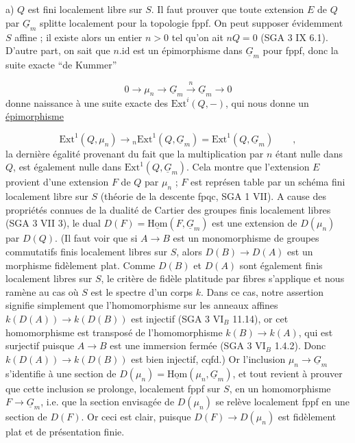 a) $Q$ est fini localement libre sur $S$. Il faut prouver que toute extension $E$ de $Q$ par $\underline{G}_m$ splitte localement pour la topologie fppf. On peut supposer évidemment $S$ affine ; il existe alors un entier $n > 0$ tel qu'on ait $nQ = 0$ (SGA 3 IX 6.1). D'autre part, on sait que $n.\mathrm{id}$ est un épimorphisme dans $\underline{G}_m$ pour fppf, donc la suite exacte ``de Kummer''

\begin{equation*}
0 \longrightarrow \mu_n \longrightarrow \underline{G}_m \xrightarrow{\ n\ } \underline{G}_m \longrightarrow 0
\end{equation*}
donne naissance à une suite exacte des $\mathrm{Ext}^i(Q, - )$, qui nous donne un \underline{épimorphisme}

\begin{equation*}
\mathrm{Ext}^1(Q,\mu_n) \longrightarrow {}_n\mathrm{Ext}^1(Q,\underline{G}_m) = \mathrm{Ext}^1(Q,\underline{G}_m) \qquad ,
\end{equation*}
la dernière égalité provenant du fait que la multiplication par $n$ étant nulle dans $Q$, est également nulle dans $\mathrm{Ext}^1(Q,\underline{G}_m)$. Cela montre que l'extension $E$ provient d'une extension $F$ de $Q$ par $\mu_n$ ; $F$ est représen
table par un schéma fini localement libre sur $S$ (théorie de la descente fpqc, SGA 1 VII). A cause des propriétés connues de la dualité de Cartier des groupes finis localement libres (SGA 3 VII 3), le dual $D(F) = \underline{\mathrm{Hom}}(F,\underline{G}_m)$ est une extension de $D(\mu_n)$ par $D(Q)$. (Il faut voir que si $A \longrightarrow B$ est un monomorphisme de groupes commutatifs finis localement libres sur $S$, alors $D(B) \longrightarrow D(A)$ est un morphisme fidèlement plat. Comme $D(B)$ et $D(A)$ sont également finis localement libres sur $S$, le critère de fidèle platitude par fibres s'applique et nous ramène au cas où $S$ est le spectre d'un corps $k$. Dans ce cas, notre assertion signifie simplement que l'homomorphisme sur les anneaux affines $k(D(A)) \longrightarrow k(D(B))$ est injectif (SGA 3 $\mathrm{VI}_B$ 11.14), or cet homomorphisme est transposé de l'homomorphisme $k(B) \longrightarrow k(A)$, qui est surjectif puisque $A \longrightarrow B$ est une immersion fermée (SGA 3 $\mathrm{VI}_B$ 1.4.2). Donc $k(D(A)) \longrightarrow k(D(B))$ est bien injectif, cqfd.) Or l'inclusion $\mu_n \to \underline{G}_m$ s'identifie à une section de $D(\mu_n) = \underline{\mathrm{Hom}}(\mu_n,\underline{G}_m)$, et tout revient à prouver que cette inclusion se prolonge, localement fppf sur $S$, en un homomorphisme $F \longrightarrow \underline{G}_m$, i.e. que la section envisagée de $D(\mu_n)$ se relève localement fppf en une section de $D(F)$. Or ceci est clair, puisque $D(F) \longrightarrow D(\mu_n)$ est fidèlement plat et de présentation finie.

